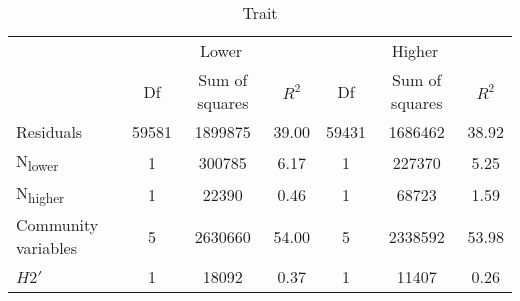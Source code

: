 \documentclass[12pt,a4paper]{article}
\begin{document}
\begin{table}[H]
\medskip
    \begin{subtable}{\linewidth}
    \caption{Trait}
    \centering
\begin{tabularx}{\linewidth}{@{} X *6{c} @{}}
\toprule
  & \multicolumn{3}{c}{Lower} & \multicolumn{3}{c}{Higher} \\ \cmidrule(l){2-4} \cmidrule(l){5-7}
  						& Df		& Sum of squares	& $R^2$	& Df 	& Sum of squares	& $R^2$ \\ \midrule
Residuals 				& 59581 & 1899875		& 39.00	& 59431 & 1686462 		& 38.92   \\
N\textsubscript{lower} 	& 1 		& 300785			& 6.17 	& 1		& 227370			& 5.25  \\
N\textsubscript{higher} 	& 1 		& 22390				& 0.46	& 1 		& 68723			& 1.59  \\
Community variables 		& 5 		& 2630660 		& 54.00 	& 5 		& 2338592		& 53.98  \\
$H2'$ 					& 1 		& 18092			&  0.37	& 1 		& 11407			& 0.26 \\ \bottomrule
\end{tabularx}
\end{subtable}
\end{table}

\end{document}
